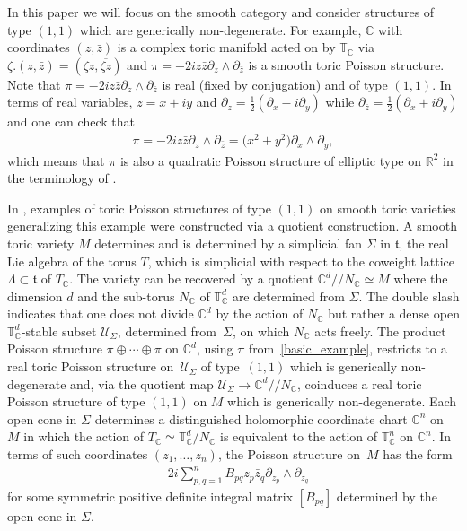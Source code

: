 \documentclass[pdftex]{sigma}
\numberwithin{equation}{section}
\begin{document}
In this paper we will focus on the smooth category and consider structures of type $(1,1)$ which are generically non-degenerate. For example, ${\mathbb C}$ with coordinates $(z,\bar{z})$ is a complex toric manifold acted on by ${\mathbb T}_{\mathbb C}$ via $\zeta.(z,\bar{z})=(\zeta z,\overline{\zeta z})$ and $\pi=-2i z\bar{z}\partial_z\wedge \partial_{\bar{z}}$ is a smooth toric Poisson structure. Note that $\pi=-2i z\bar{z}\partial_z\wedge \partial_{\bar{z}}$ is real (f\/ixed by conjugation) and of type $(1,1)$. In terms of real variables, $z=x+iy$ and $\partial_z=\frac{1}{2}(\partial_x-i\partial_y)$ while $\partial_{\bar{z}}=\frac{1}{2}(\partial_x+i\partial_y)$ and one can check that
\begin{gather}\label{basic_example}
\pi=-2i z\bar{z}\partial_z\wedge \partial_{\bar{z}}=\big(x^2+y^2\big)\partial_x\wedge\partial_y,
\end{gather}
which means that $\pi$ is also a quadratic Poisson structure of elliptic type on ${\mathbb R}^2$ in the terminology of \cite{LiuXu}.

In \cite{Caine}, examples of toric Poisson structures of type $(1,1)$ on smooth toric varieties generalizing this example were constructed via a quotient construction. A smooth toric variety $M$ determines and is determined by a simplicial fan $\Sigma$ in ${\mathfrak t}$, the real Lie algebra of the torus $T$, which is simplicial with respect to the coweight lattice $\Lambda\subset{\mathfrak t}$ of $T_{\mathbb C}$. The variety can be recovered by a quotient ${\mathbb C}^d//N_{\mathbb C}\simeq M$ where the dimension $d$ and the sub-torus $N_{\mathbb C}$ of ${\mathbb T}_{\mathbb C}^d$ are determined from $\Sigma$. The double slash indicates that one does not divide ${\mathbb C}^d$ by the action of $N_{\mathbb C}$ but rather a dense open ${\mathbb T}_{\mathbb C}^d$-stable subset $\mathcal U_\Sigma$, determined from~$\Sigma$, on which $N_{\mathbb C}$ acts freely. The product Poisson structure $\pi\oplus \cdots \oplus \pi$ on ${\mathbb C}^d$, using $\pi$ from~\eqref{basic_example}, restricts to a real toric Poisson structure on~$\mathcal U_\Sigma$ of type~$(1,1)$ which is generically non-degenerate and, via the quotient map $\mathcal U_\Sigma\to {\mathbb C}^d//N_{\mathbb C}$, coinduces a real toric Poisson structure of type $(1,1)$ on $M$ which is generically non-degenerate. Each open cone in $\Sigma$ determines a distinguished holomorphic coordinate chart ${\mathbb C}^n$ on $M$ in which the action of $T_{\mathbb C}\simeq {\mathbb T}_{\mathbb C}^d/N_{\mathbb C}$ is equivalent to the action of ${\mathbb T}_{\mathbb C}^n$ on ${\mathbb C}^n$. In terms of such coordinates $(z_1,\dots,z_n)$, the Poisson structure on~$M$ has the form
\begin{gather}\label{model_for_toric_PS}
-2i\sum_{p,q=1}^n B_{pq}z_p\bar{z}_q\partial_{z_p}\wedge\partial_{\bar{z_q}}
\end{gather}
for some symmetric positive def\/inite integral matrix $[B_{pq}]$ determined by the open cone in $\Sigma$.
\end{document}
